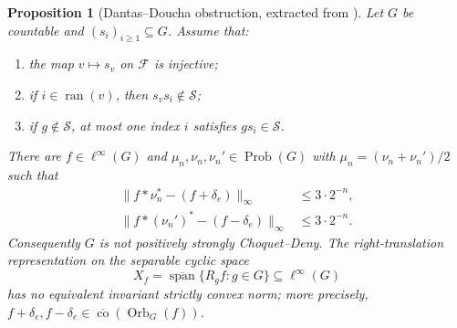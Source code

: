 \documentclass[11pt,letterpaper]{amsart}
\newtheorem{proposition}[theorem]{Proposition}
\theoremstyle{definition}
\theoremstyle{remark}
\DeclareMathOperator{\co}{co}
\DeclareMathOperator{\Orb}{Orb}
\DeclareMathOperator{\Prob}{Prob}
\DeclareMathOperator{\ran}{ran}
\DeclareMathOperator{\Span}{span}
\begin{document}
\begin{proposition}[{Dantas--Doucha obstruction, extracted from
\cite[Example~5.5, Claim~2]{DD}}]\label{thm:certificate}
Let $G$ be countable and $(s_i)_{i\geq1}\subseteq G$. Assume that:
\begin{enumerate}
\item the map $v\mapsto s_v$ on $\mathcal F$ is injective;
\item if $i\in\ran(v)$, then $s_vs_i\notin\mathcal S$;
\item if $g\notin\mathcal S$, at most one index $i$ satisfies
$gs_i\in\mathcal S$.
\end{enumerate}
There are $f\in\ell^\infty(G)$ and
$\mu_n,\nu_n,\nu_n'\in\Prob(G)$ with $\mu_n=(\nu_n+\nu_n')/2$ such that
\begin{equation}\label{eq:endpoint-estimates}
 \begin{aligned}
 \|f*\nu_n^*-(f+\delta_e)\|_\infty&\leq3\cdot2^{-n},\\
 \|f*(\nu_n')^*-(f-\delta_e)\|_\infty&\leq3\cdot2^{-n}.
 \end{aligned}
\end{equation}
Consequently $G$ is not positively strongly Choquet--Deny. The
right-translation representation on the separable cyclic space
\[
 X_f=\overline{\Span}\{R_gf:g\in G\}\subseteq\ell^\infty(G)
\]
has no equivalent invariant strictly convex norm; more precisely,
$f+\delta_e,f-\delta_e\in\overline{\co}(\Orb_G(f))$.
\end{proposition}
\end{document}
